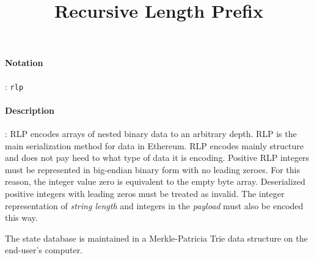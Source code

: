 \documentclass[10pt,a4paper,oneside]{scrartcl}
\author{}
\title{Recursive Length Prefix}
\date{}
\begin{document}
\maketitle
\paragraph{Notation}: \texttt{rlp}
\paragraph{Description}: RLP encodes arrays of nested binary data to an arbitrary depth. RLP is the main serialization method for data in Ethereum. RLP encodes mainly structure and does not pay heed to what type of data it is encoding. Positive RLP integers must be represented in big-endian binary form with no leading zeroes. For this reason, the integer value zero is equivalent to the empty byte array. Deserialized positive integers with leading zeros must be treated as invalid. The integer representation of \textsl{string length} and integers in the \textsl{payload}  must also be encoded this way.\supercite{EF2017}

The state database is maintained in a Merkle-Patricia Trie data structure on the end-user's computer.\supercite{Wood2017}


\printbibliography
\end{document}
